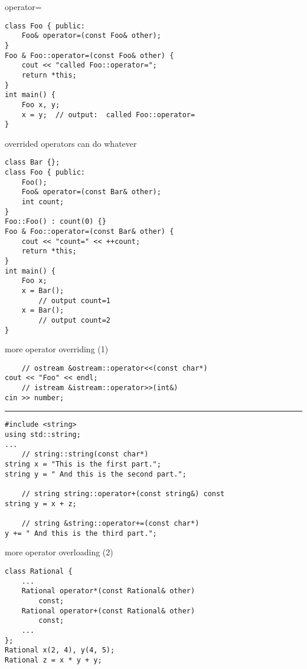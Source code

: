 \begin{frame}[fragile,label=opOverload1]{operator=}
\lstset{language=C++,style=smaller}
\begin{lstlisting}
class Foo { public:
    Foo& operator=(const Foo& other);
}
Foo & Foo::operator=(const Foo& other) {
    cout << "called Foo::operator=";
    return *this;
}
int main() {
    Foo x, y;
    x = y;  // output:  called Foo::operator=
}
\end{lstlisting}
\end{frame}

\begin{frame}[fragile,label=opOverload2]{overrided operators can do whatever}
\lstset{language=C++,style=smaller}
\begin{lstlisting}
class Bar {};
class Foo { public:
    Foo();
    Foo& operator=(const Bar& other);
    int count;
}
Foo::Foo() : count(0) {}
Foo & Foo::operator=(const Bar& other) {
    cout << "count=" << ++count;
    return *this;
}
int main() {
    Foo x;
    x = Bar();
        // output count=1
    x = Bar();
        // output count=2
}
\end{lstlisting}
\end{frame}


\begin{frame}[fragile,label=opOverExs]{more operator overriding (1)}
\lstset{language=C++,style=smaller}
\begin{lstlisting}
    // ostream &ostream::operator<<(const char*)
cout << "Foo" << endl;
    // istream &istream::operator>>(int&)
cin >> number;
\end{lstlisting}
\hrule
\begin{lstlisting}
#include <string>
using std::string;
...
    // string::string(const char*)
string x = "This is the first part.";
string y = " And this is the second part.";

    // string string::operator+(const string&) const
string y = x + z;

    // string &string::operator+=(const char*)
y += " And this is the third part.";
\end{lstlisting}
\end{frame}

\begin{frame}[fragile,label=opOverExs2]{more operator overloading (2)}
\begin{lstlisting}
class Rational {
    ...
    Rational operator*(const Rational& other)
        const;
    Rational operator+(const Rational& other)
        const;
    ...
};
Rational x(2, 4), y(4, 5);
Rational z = x * y + y;
\end{lstlisting}
\end{frame}

